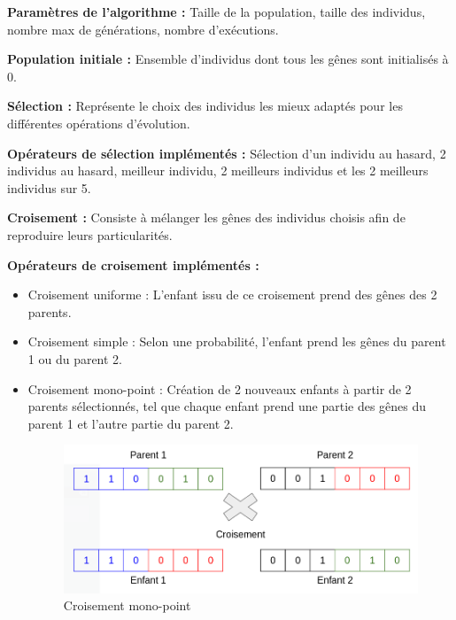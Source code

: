 \documentclass[12pt]{article}
\begin{document}
\begin{description}

\item{\textbf{Paramètres de l'algorithme :}} Taille de la population, taille des individus, nombre max de générations, nombre d'exécutions.

\item{\textbf{Population initiale :}} Ensemble d'individus dont tous les gênes sont initialisés à 0.

\item{\textbf{Sélection :}} Représente le choix des individus les mieux adaptés pour les différentes opérations d'évolution.
\item{\textbf{Opérateurs de sélection implémentés :}}  Sélection d'un individu au hasard, 2 individus au hasard, meilleur individu, 2 meilleurs individus et les 2 meilleurs individus sur 5.

\item{\textbf{Croisement :}} Consiste à mélanger les gênes des individus choisis afin de reproduire leurs particularités.
\item{\textbf{Opérateurs de croisement implémentés :}}
\begin{itemize}[label=-]
\item Croisement uniforme : L'enfant issu de ce croisement prend des gênes des 2 parents.
\item Croisement simple : Selon une probabilité, l'enfant prend les gênes du parent 1 ou du parent 2.
\item Croisement mono-point : Création de 2 nouveaux enfants à partir de 2 parents sélectionnés, tel que chaque enfant prend une partie des gênes du parent 1 et l'autre partie du parent 2.

\begin{figure}[H]
		\begin{center}
			\includegraphics[scale=0.4]{img/crois_mono_point.png}
			\caption{Croisement mono-point}
			\label{crois_mono-point}
		\end{center}
\end{figure}


\end{itemize}
\end{description}
\end{document}
